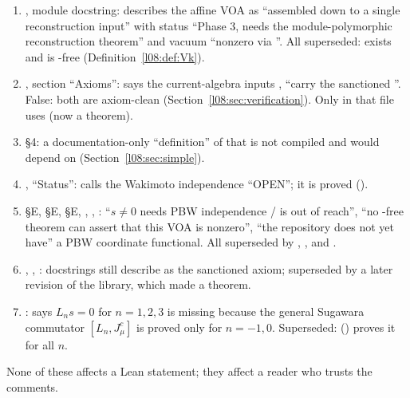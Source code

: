 \begin{warning}[title={Stale or incorrect docstrings (severity: documentation)}]
\begin{enumerate}
\item {}, module docstring: describes the affine VOA as ``assembled down
  to a single reconstruction input'' with status ``Phase 3, needs the module-polymorphic reconstruction
  theorem'' and vacuum ``nonzero via ''. All superseded:  exists and is
  -free (Definition~\ref{l08:def:Vk}).
\item {}, section ``Axioms'': says the current-algebra inputs
  ,  ``carry the sanctioned ''. False: both are axiom-clean
  (Section~\ref{l08:sec:verification}). Only  in that file uses  (now a theorem).
\item {} \S4: a documentation-only ``definition'' of
  \allowbreak{} that is not compiled and would depend on 
  (Section~\ref{l08:sec:simple}).
\item {}, ``Status'': calls the Wakimoto independence
  ``OPEN''; it is proved (\allowbreak{}).
\item {} \S E,  \S E,
   \S E, , ,
  : ``$s\ne0$ needs PBW independence / is out of reach'', ``no
  -free theorem can assert that this VOA is nonzero'', ``the repository does not yet have'' a PBW
  coordinate functional. All superseded by \allowbreak{}\allowbreak{}\allowbreak{}, \allowbreak{}\allowbreak{}\allowbreak{},
  \allowbreak{}\allowbreak{}\allowbreak{}\allowbreak{} and .
\item {}, , : docstrings still describe
   as the sanctioned axiom; superseded by a later revision of the library, which made  a theorem.
\item {}: says $L_ns=0$ for $n=1,2,3$ is missing because the
  general Sugawara commutator $[L_n,J^c_\mu]$ is proved only for $n=-1,0$. Superseded: 
  () proves it for all $n$.
\end{enumerate}
None of these affects a Lean statement; they affect a reader who trusts the comments.
\end{warning}

